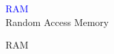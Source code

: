 \documentclass[10pt,xcolor={dvipsnames}]{beamer}
\begin{document}
\begin{frame}
\begin{center}
\Huge{\textcolor{blue}{RAM}} \\ \pause
\Large{Random Access Memory}
\end{center}
\end{frame}

\begin{frame}{RAM}
\begin{center}
\end{center}
\end{frame}
\end{document}
